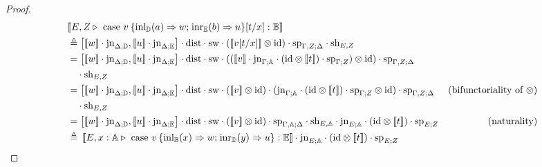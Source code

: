 \documentclass[10pt,a4paper]{amsart}
\theoremstyle{definition}
\theoremstyle{definition}
\theoremstyle{definition}
\theoremstyle{definition}
\theoremstyle{definition}
\theoremstyle{definition}
\begin{document}
\begin{proof}
\begin{align*}
  &[\![E, Z \triangleright \text{ case } v  \hspace{2pt}  \{\text{inl}_{\mathbb{D}} (a) \Rightarrow w ; \hspace{1pt} \text{inr}_{\mathbb{E}} (b) \Rightarrow u\} [t/x]: \mathbb{B}]\!] \\
  & \triangleq  \left[[\![ w]\!] \cdot \text{jn}_{ \Delta;\mathbb{D}},[\![ u ]\!] \cdot \text{jn}_{ \Delta;\mathbb{E}}\right] \cdot \text{dist} \cdot \text{sw} \cdot ([\![ v [t/x] ]\!]   \otimes \text{id})  \cdot \text{sp}_{\Gamma, Z;\Delta} \cdot \text{sh}_{E,Z} \\
  & = \left[[\![w]\!] \cdot \text{jn}_{ \Delta;\mathbb{D}},[\![u ]\!] \cdot \text{jn}_{ \Delta;\mathbb{E}}\right] \cdot \text{dist} \cdot \text{sw} \cdot (([\![ v]\!]  \cdot \text{jn}_{\Gamma; \mathbb{A}} \cdot (\text{id} \otimes [\![  t ]\!] ) \cdot \text{sp}_{\Gamma;Z} )\otimes \text{id}) \cdot \text{sp}_{\Gamma, Z;\Delta} \\
  & \hspace{10pt} \cdot \text{sh}_{E,Z} \\
  & =  \left[[\![w]\!] \cdot \text{jn}_{ \Delta;\mathbb{D}},[\![u ]\!] \cdot \text{jn}_{ \Delta;\mathbb{E}}\right] \cdot \text{dist} \cdot \text{sw} \cdot ([\![ v]\!] \otimes \text{id}) \cdot (\text{jn}_{\Gamma; \mathbb{A}} \cdot (\text{id} \otimes [\![  t ]\!] ) \cdot \text{sp}_{\Gamma;Z} \otimes \text{id}) \cdot \text{sp}_{\Gamma, Z;\Delta}  & {\text{(bifunctoriality of $\otimes$)}} \\
  & \hspace{10pt} \cdot \text{sh}_{E,Z}\\
  & = \left[[\![w]\!] \cdot \text{jn}_{ \Delta;\mathbb{D}},[\![u ]\!] \cdot \text{jn}_{ \Delta;\mathbb{E}}\right] \cdot \text{dist} \cdot \text{sw} \cdot ([\![ v]\!] \otimes \text{id}) \cdot \text{sp}_{\Gamma, \typeA;\Delta}  \cdot \text{sh}_{E,\typeA}  \cdot  \text{jn}_{E; \typeA} \cdot (\text{id} \otimes [\![ t ]\!] ) \cdot \text{sp}_{E;Z}  & {(\text{naturality})}   \\
  & \triangleq  \hspace{2pt} [\![E,  x:\mathbb{A} \triangleright \text{ case } v \hspace{2pt}  \{\text{inl}_{\mathbb{B}} (x) \Rightarrow w ; \hspace{1pt} \text{inr}_{\mathbb{D}} (y) \Rightarrow u\}: \mathbb{E}]\!]  \cdot  \text{jn}_{E; \typeA} \cdot (\text{id} \otimes [\![ t ]\!] ) \cdot \text{sp}_{E;Z}
\end{align*}



\end{proof}
\end{document}
